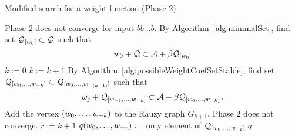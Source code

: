 \begin{algorithm}
  \caption{Modified search for a weight function (Phase 2)}
    \label{alg:weightFunction_modified}
  \begin{algorithmic}[1]
    		\RETURN Phase 2 does not converge for input $bb\dots b$.
    	\ENDIF
    \ENDFOR
        \STATE By Algorithm~\ref{alg:minimalSet}, find set $\mathcal{Q}_{[w_0]} \subset \mathcal{Q}$ such that
          $$
          w_0 + \mathcal{Q} \subset \mathcal{A} + \beta \mathcal{Q}_{[w_0]}
          $$\vspace{-20pt}
    \ENDFOR
    \STATE $k:=0$
        \STATE $k:= k +1$
            \STATE By Algorithm~\ref{alg:possibleWeightCoefSetStable}, find set $\mathcal{Q}_{[w_{0}, \dots, w_{-k}]} \subset \mathcal{Q}_{[w_{0}, \dots, w_{-(k-1)}]}$ such that
              $$
              w_j + \mathcal{Q}_{[w_{-1}, \dots, w_{-k}]} \subset \mathcal{A} + \beta \mathcal{Q}_{[w_{0}, \dots, w_{-k}]}\,.
              $$\vspace{-20pt}
              	\STATE Add the vertex $(w_{0}, \dots, w_{-k})$ to the Rauzy graph $G_{k+1}$.
              		\RETURN Phase 2 does not converge.
              	\ENDIF
              \ENDIF
        \ENDFOR  
    \ENDWHILE  
    \STATE $r:= k+1$
	    		\STATE $q(w_{0}, \dots, w_{-r}):=$ only element of $\mathcal{Q}_{[w_{0}, \dots, w_{-l}]}$
	    	\ENDFOR
	    \ENDFOR
	\ENDFOR
    \RETURN $q$
  \end{algorithmic}
\end{algorithm}





